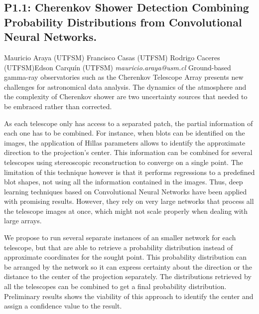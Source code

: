 \documentclass{report}
\begin{document}
\subsection*{P1.1: Cherenkov Shower Detection Combining Probability Distributions from Convolutional Neural Networks.}
\bigskip
Mauricio Araya (UTFSM) \newline Francisco Casas (UTFSM) \newline  Rodrigo Caceres (UTFSM)\newline  Edson Carquín (UTFSM)\newline  \newline  \newline\newline
{\it mauricio.araya@usm.cl}\newline
\newline\newline
Ground-based gamma-ray observatories such as the Cherenkov Telescope Array presents new challenges for astronomical data analysis. The dynamics of the atmosphere and the complexity of Cherenkov shower are two uncertainty sources that needed to be embraced rather than corrected.

As each telescope only has access to a separated patch, the partial information of each one has to be combined. For instance, when blots can be identified on the images, the application of Hillas parameters allows to identify the approximate direction to the projection's center. This information can be combined for several telescopes using stereoscopic reconstruction to converge on a single point. The limitation of this technique however is that it performs regressions to a predefined blot shapes, not using all the information contained in the images. Thus, deep learning techniques based on Convolutional Neural Networks have been applied with promising results. However, they rely on very large networks that process all the telescope images at once, which might not scale properly when dealing with large arrays.

We propose to run several separate instances of an smaller network for each telescope, but that are able to retrieve a probability distribution instead of approximate coordinates for the sought point. This probability distribution can be arranged by the network so it can express certainty about the direction or the distance to the center of the projection separately. The distributions retrieved by all the telescopes can be combined to get a final probability distribution. Preliminary results shows the viability of this approach to identify the center and assign a confidence value to the result.\newline
\newpage
\end{document}
